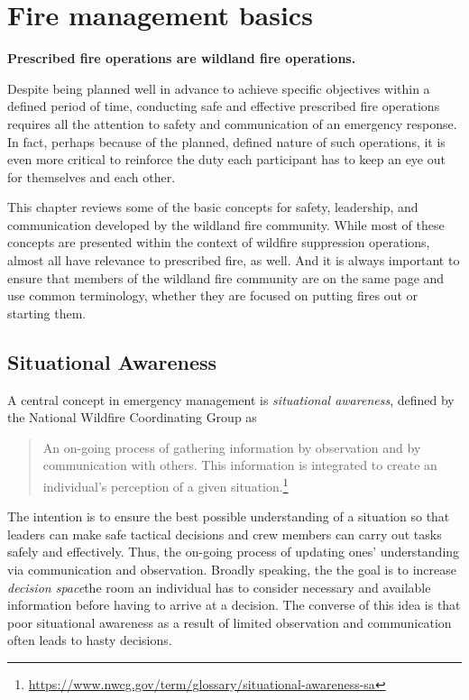 \chapter{Fire management basics}

\textbf{Prescribed fire operations are wildland fire operations.} 
\vspace{2em}

Despite being planned well in advance to achieve specific objectives within a defined period of time, conducting safe and effective prescribed fire operations requires all the attention to safety and communication of an emergency response. 
In fact, perhaps because of the planned, defined nature of such operations, it is even more critical to reinforce the duty each participant has to keep an eye out for themselves and each other. 

This chapter reviews some of the basic concepts for safety, leadership, and communication developed by the wildland fire community. 
While most of these concepts are presented within the context of wildfire suppression operations, almost all have relevance to prescribed fire, as well. 
And it is always important to ensure that members of the wildland fire community are on the same page and use common terminology, whether they are focused on putting fires out or starting them. 

\section{Situational Awareness}

A central concept in emergency management is \emph{situational awareness}, defined by the National Wildfire Coordinating Group as

\begin{quote}
	An on-going process of gathering information by observation and by communication with others. 
	This information is integrated to create an individual's perception of a given situation.\footnote{\href{https://www.nwcg.gov/term/glossary/situational-awareness-sa}{https://www.nwcg.gov/term/glossary/situational-awareness-sa}}
\end{quote}

The intention is to ensure the best possible understanding of a situation so that leaders can make safe tactical decisions and crew members can carry out tasks safely and effectively.
Thus, the on-going process of updating ones' understanding via communication and observation. 
Broadly speaking, the the goal is to increase \emph{decision space}\textemdash the room an individual has to consider necessary and available information before having to arrive at a decision. 
The converse of this idea is that poor situational awareness as a result of limited observation and communication often leads to hasty decisions. 

